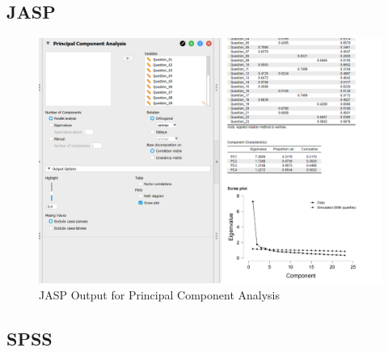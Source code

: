 \documentclass[
]{book}
\begin{document}
\hypertarget{jasp}{%
\subsection{JASP}\label{jasp}}

\begin{figure}[!h]
\includegraphics{Screenshots/Principal Component Analysis/pcaJASPissue} \caption{\label{fig:pcaJASP}JASP Output for Principal Component Analysis}\label{fig:pcaJASP}
\end{figure}

\hypertarget{spss}{%
\subsection{SPSS}\label{spss}}
\end{document}
